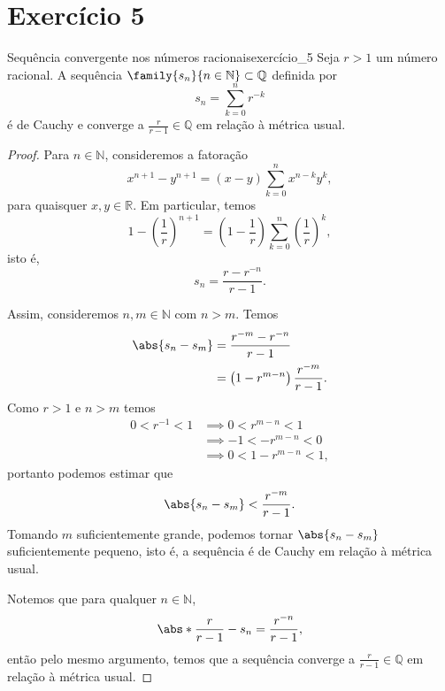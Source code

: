 \section*{Exercício 5}
\begin{proposition}{Sequência convergente nos números racionais}{exercício_5}
    Seja \(r > 1\) um número racional. A sequência \(\family{s_n}{n\in\mathbb{N}}\subset\mathbb{Q}\) definida por
    \begin{equation*}
        s_n = \sum_{k = 0}^{n} r^{-k}
    \end{equation*}
    é de Cauchy e converge a \(\frac{r}{r-1} \in \mathbb{Q}\) em relação à métrica usual.
\end{proposition}
\begin{proof}
    Para \(n \in \mathbb{N}\), consideremos a fatoração
    \begin{equation*}
        x^{n+1} - y^{n+1} = (x - y)\sum_{k = 0}^{n} x^{n - k} y^{k},
    \end{equation*}
    para quaisquer \(x,y \in \mathbb{R}\). Em particular, temos
    \begin{equation*}
        1 - \left(\frac1r\right)^{n+1} = \left(1 - \frac1r\right)\sum_{k=0}^{n} \left(\frac{1}{r}\right)^{k},
    \end{equation*}
    isto é,
    \begin{equation*}
        s_n = \frac{r - r^{-n}}{r - 1}.
    \end{equation*}

    Assim, consideremos \(n, m \in \mathbb{N}\) com \(n > m\). Temos
    \begin{align*}
        \abs{s_n - s_m} &= \frac{r^{-m} - r^{-n}}{r - 1}\\
                        &= \left(1 - r^{m-n}\right) \frac{r^{-m}}{r - 1}.
    \end{align*}
    Como \(r > 1\) e \(n > m\) temos
    \begin{align*}
        0 < r^{-1} < 1 &\implies 0 < r^{m-n} < 1\\
                       &\implies -1 < -r^{m-n} < 0\\
                       &\implies 0 < 1 - r^{m-n} < 1,
    \end{align*}
    portanto podemos estimar que
    \begin{equation*}
        \abs{s_n - s_m} < \frac{r^{-m}}{r - 1}.
    \end{equation*}
    Tomando \(m\) suficientemente grande, podemos tornar \(\abs{s_n - s_m}\) suficientemente pequeno, isto é, a sequência é de Cauchy em relação à métrica usual.

    Notemos que para qualquer \(n \in \mathbb{N}\),
    \begin{equation*}
        \abs*{\frac{r}{r-1} - s_n} = \frac{r^{-n}}{r-1},
    \end{equation*}
    então pelo mesmo argumento, temos que a sequência converge a \(\frac{r}{r-1} \in \mathbb{Q}\) em relação à métrica usual.
\end{proof}
